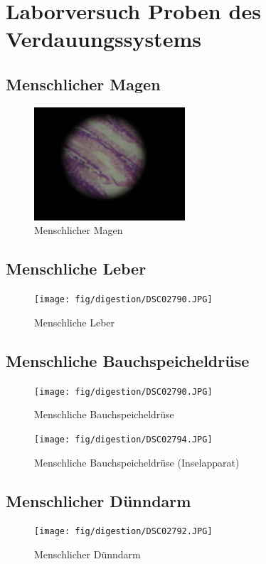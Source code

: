 \section{Laborversuch Proben des Verdauungssystems}

\subsection{Menschlicher Magen}
\begin{figure}[h!]
    \centering
    \includegraphics[width=0.5\textwidth]{fig/digestion/DSC02784.JPG}
    \caption{Menschlicher Magen}
    \label{fig:human_stomach}
\end{figure}

\subsection{Menschliche Leber}
\begin{figure}[h!]
    \centering
    \texttt{[image: fig/digestion/DSC02790.JPG]}
    \caption{Menschliche Leber}
    \label{fig:human_liver}
\end{figure}
\clearpage

\subsection{Menschliche Bauchspeicheldrüse}
\begin{figure}[h!]
    \centering
    \texttt{[image: fig/digestion/DSC02790.JPG]}
    \caption{Menschliche Bauchspeicheldrüse}
    \label{fig:human_pancreas}
\end{figure}
\begin{figure}[h!]
    \centering
    \texttt{[image: fig/digestion/DSC02794.JPG]}
    \caption{Menschliche Bauchspeicheldrüse (Inselapparat)}
    \label{fig:human_pancreas_2}
\end{figure}
\clearpage

\subsection{Menschlicher Dünndarm}
\begin{figure}[h!]
    \centering
    \texttt{[image: fig/digestion/DSC02792.JPG]}
    \caption{Menschlicher Dünndarm}
    \label{fig:human_mamal_lieum}
\end{figure}

